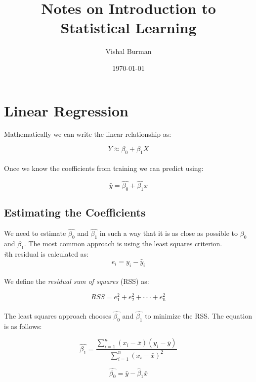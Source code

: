 \documentclass{article}
\title{Notes on Introduction to Statistical Learning}
\author{Vishal Burman}
\date{\today}
\begin{document}
	\maketitle
	\section{Linear Regression}

	Mathematically we can write the linear relationship as:

	\begin{equation}
		Y \approx \beta_0 + \beta_1X
	\end{equation}\\
	Once we know the coefficients from training we can predict using:

	\begin{equation}
		\hat{y} = \hat{\beta_0} + \hat{\beta_1}x
	\end{equation}

	\subsection{Estimating the Coefficients}

	We need to estimate $\hat{\beta_0}$ and $\hat{\beta_1}$ in such a way that it is as close as possible to $\beta_0$ and $\beta_1$. The most common approach is using the least squares criterion.\\

	\textit{i}th residual is calculated as:
	\begin{equation}
		e_i =  y_i - \hat{y}_i
	\end{equation}\\
	We define the \textit{residual sum of squares} (RSS) as:

	\begin{equation}
		RSS = e_1^2 + e_2^2 + \cdot\cdot\cdot + e_n^2
	\end{equation}\\

	The least squares approach chooses $\hat{\beta_0}$ and $\hat{\beta_1}$ to minimize the RSS. The equation is as follows:

	\begin{equation}
		\hat{\beta_1} = \frac{\sum_{i=1}^{n}(x_i - \bar{x})(y_i - \bar{y})}{\sum_{i=1}^{n}(x_i - \bar{x})^2}
	\end{equation}

	\begin{equation}
		\hat{\beta_0} = \bar{y} - \hat{\beta}_1\bar{x}
	\end{equation}
\end{document}
